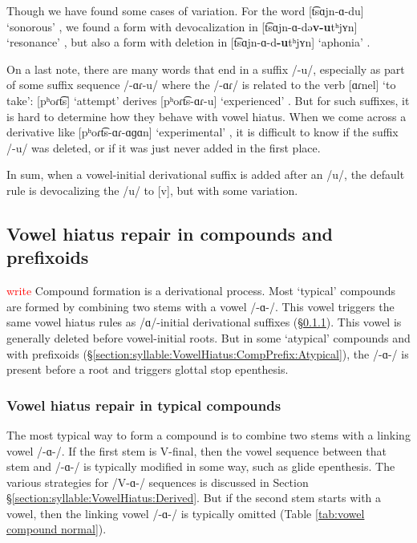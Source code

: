 {	Though we have found some cases of variation. For the word [t͡sɑjn-ɑ-du] `sonorous' , we found a  form  with devocalization in [t͡sɑjn-ɑ-də\textbf{v-u}tʰjʏn] `resonance'    , but also a form with deletion in  [t͡sɑjn-ɑ-d\textbf{-u}tʰjʏn] `aphonia' .
	
	On a last note, there are   many words that end in a suffix /-u/, especially as part of some suffix sequence /-ɑɾ-u/ where the /-ɑɾ/ is related to the verb [ɑɾnel] `to take': [pʰoɾt͡s] `attempt'  derives [pʰoɾt͡s-ɑɾ-u]  `experienced' . But for such suffixes, it is hard to determine how they behave with vowel hiatus.  When we come across a derivative like [pʰoɾt͡s-ɑɾ-ɑɡɑn] `experimental' , it is difficult to know if the suffix /-u/ was deleted, or if it was just never added in the first place. 
	
	In sum, when a vowel-initial derivational suffix is added after an /u/, the default rule is devocalizing the /u/ to [v], but with some variation. 
	
	
	\subsection{Vowel hiatus repair in compounds and prefixoids}\label{section:syllable:VowelHiatus:CompPrefix}
	\textcolor{red}{write}
	Compound formation is a derivational process. Most `typical' compounds are formed by combining two stems with a vowel /-ɑ-/. This vowel triggers the same vowel hiatus rules as /ɑ/-initial derivational suffixes (\S\ref{section:syllable:VowelHiatus:CompPrefix:Typical}). This vowel is generally deleted before vowel-initial roots. But in some `atypical' compounds and with prefixoids (\S\ref{section:syllable:VowelHiatus:CompPrefix:Atypical}), the /-ɑ-/ is present before a root and triggers glottal stop epenthesis. 
	\subsubsection{Vowel hiatus repair in typical compounds} \label{section:syllable:VowelHiatus:CompPrefix:Typical}
	The most typical way to form a compound is to combine two stems with a linking vowel /-ɑ-/. If the first stem is V-final, then the vowel sequence between that stem and /-ɑ-/ is typically modified in some way, such as glide epenthesis. The various strategies for /V-ɑ-/ sequences is discussed in Section \S\ref{section:syllable:VowelHiatus:Derived}. But if the second  stem starts with a vowel, then the linking vowel /-ɑ-/ is typically omitted (Table \ref{tab:vowel compound normal}). 
	
}
